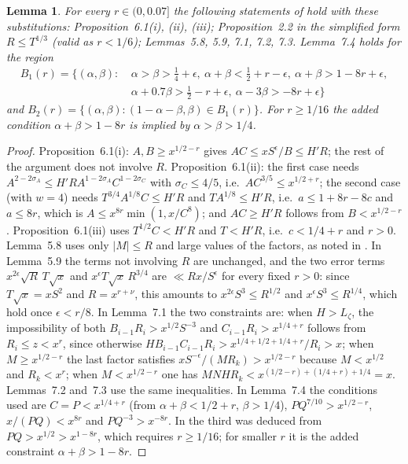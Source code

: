 \documentclass[11pt]{amsart}
\newtheorem{lemma}[theorem]{Lemma}
\theoremstyle{definition}
\theoremstyle{remark}
\newcommand{\J}{\cite{J}}
\begin{document}
\begin{lemma}\label{lem:rcheck}
For every $r\in(0,0.07]$ the following statements of \J{} hold with these substitutions: Proposition~6.1(i), (ii), (iii); Proposition~2.2 in the simplified form $R\le T^{1/3}$ (valid as $r<1/6$); Lemmas~5.8, 5.9, 7.1, 7.2, 7.3. Lemma~7.4 holds for the region
\[
\begin{aligned}B_1(r)=\{(\alpha,\beta):\ &\alpha>\beta>\tfrac14+\epsilon,\ \alpha+\beta<\tfrac12+r-\epsilon,\ \alpha+\beta>1-8r+\epsilon,\\ &\alpha+0.7\beta>\tfrac12-r+\epsilon,\ \alpha-3\beta>-8r+\epsilon\}\end{aligned}
\]
and $B_2(r)=\{(\alpha,\beta):(1-\alpha-\beta,\beta)\in B_1(r)\}$. For $r\ge1/16$ the added condition $\alpha+\beta>1-8r$ is implied by $\alpha>\beta>1/4$.
\end{lemma}

\begin{proof}
Proposition~6.1(i): $A,B\ge x^{1/2-r}$ gives $AC\le xS^{\epsilon}/B\le H'R$; the rest of the argument does not involve $R$. Proposition~6.1(ii): the first case needs $A^{2-2\sigma_A}\le H'RA^{1-2\sigma_A}C^{1-2\sigma_C}$ with $\sigma_C\le 4/5$, i.e.\ $AC^{3/5}\le x^{1/2+r}$; the second case (with $w=4$) needs $T^{3/4}A^{1/8}C\le H'R$ and $TA^{1/8}\le H'R$, i.e.\ $a\le 1+8r-8c$ and $a\le 8r$, which is $A\le x^{8r}\min(1,x/C^8)$; and $AC\ge H'R$ follows from $B<x^{1/2-r}$. Proposition~6.1(iii) uses $T^{1/2}C<H'R$ and $T<H'R$, i.e.\ $c<1/4+r$ and $r>0$. Lemma~5.8 uses only $|M|\le R$ and large values of the factors, as noted in \J{}. In Lemma~5.9 the terms not involving $R$ are unchanged, and the two error terms $x^{2\epsilon}\sqrt R\,T\sqrt x$ and $x^{\epsilon}T\sqrt x\,R^{3/4}$ are $\ll Rx/S^{\epsilon}$ for every fixed $r>0$: since $T\sqrt x=xS^2$ and $R=x^{r+\nu}$, this amounts to $x^{2\epsilon}S^{3}\le R^{1/2}$ and $x^{\epsilon}S^{3}\le R^{1/4}$, which hold once $\epsilon<r/8$. In Lemma~7.1 the two constraints are: when $H>L_\zeta$, the impossibility of both $B_{i-1}R_i>x^{1/2}S^{-3}$ and $C_{i-1}R_i>x^{1/4+r}$ follows from $R_i\le z<x^{r}$, since otherwise $HB_{i-1}C_{i-1}R_i>x^{1/4+1/2+1/4+r}/R_i>x$; when $M\ge x^{1/2-r}$ the last factor satisfies $xS^{-\epsilon}/(MR_k)>x^{1/2-r}$ because $M<x^{1/2}$ and $R_k<x^r$; when $M<x^{1/2-r}$ one has $MNHR_k<x^{(1/2-r)+(1/4+r)+1/4}=x$. Lemmas~7.2 and~7.3 use the same inequalities. In Lemma~7.4 the conditions used are $C=P<x^{1/4+r}$ (from $\alpha+\beta<1/2+r$, $\beta>1/4$), $PQ^{7/10}>x^{1/2-r}$, $x/(PQ)<x^{8r}$ and $PQ^{-3}>x^{-8r}$. In \J{} the third was deduced from $PQ>x^{1/2}>x^{1-8r}$, which requires $r\ge1/16$; for smaller $r$ it is the added constraint $\alpha+\beta>1-8r$.
\end{proof}
\end{document}
